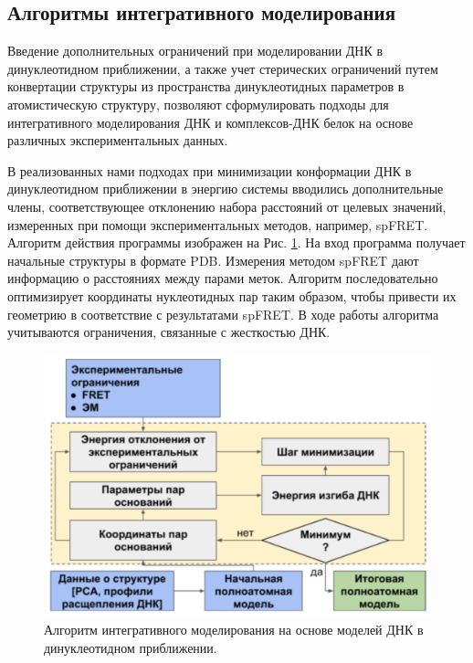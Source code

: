 \subsection{Алгоритмы интегративного моделирования}
\label{sec:p1:int_algo}
Введение дополнительных ограничений при моделировании ДНК в динуклеотидном приближении, а также учет стерических ограничений путем конвертации структуры из пространства динуклеотидных параметров в атомистическую структуру, позволяют сформулировать подходы для интегративного моделирования ДНК и комплексов-ДНК белок на основе различных экспериментальных данных.

В реализованных нами подходах при минимизации конформации ДНК в динуклеотидном приближении в энергию системы вводились дополнительные члены, соответствующее отклонению набора расстояний от целевых значений, измеренных при помощи экспериментальных методов, например, spFRET. Алгоритм действия программы изображен на Рис. \ref{fig:p1:int_mod_dinuc}. На вход программа получает начальные структуры в формате PDB. Измерения методом spFRET дают информацию о расстояниях между парами меток. Алгоритм последовательно оптимизирует координаты нуклеотидных пар таким образом, чтобы привести их геометрию в соответствие с результатами spFRET. В ходе работы алгоритма учитываются ограничения, связанные с жесткостью ДНК.


\begin{figure}[H] 
  \center
  \includegraphics [width=\textwidth] {images/p1/int_mod_dinuc}
  \caption{Алгоритм интегративного моделирования на основе моделей ДНК в динуклеотидном приближении.} 
  \label{fig:p1:int_mod_dinuc}
\end{figure}